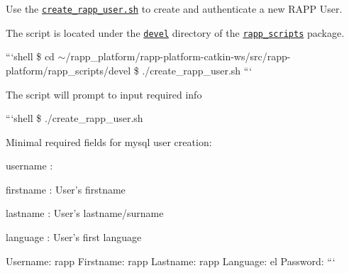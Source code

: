 Use the \href{https://github.com/rapp-project/rapp-platform/blob/master/rapp_scripts/devel/create_rapp_user.sh}{\tt create\-\_\-rapp\-\_\-user.\-sh} to create and authenticate a new R\-A\-P\-P User.

The script is located under the \href{https://github.com/rapp-project/rapp-platform/tree/master/rapp_scripts/devel}{\tt devel} directory of the \href{https://github.com/rapp-project/rapp-platform/tree/master/rapp_scripts}{\tt rapp\-\_\-scripts} package.

```shell \$ cd $\sim$/rapp\-\_\-platform/rapp-\/platform-\/catkin-\/ws/src/rapp-\/platform/rapp\-\_\-scripts/devel \$ ./create\-\_\-rapp\-\_\-user.sh ```

The script will prompt to input required info

```shell \$ ./create\-\_\-rapp\-\_\-user.sh

Minimal required fields for mysql user creation\-:
\begin{DoxyItemize}
\item username \-:
\item firstname \-: User's firstname
\item lastname \-: User's lastname/surname
\item language \-: User's first language
\end{DoxyItemize}

Username\-: rapp Firstname\-: rapp Lastname\-: rapp Language\-: el Password\-: ``` 